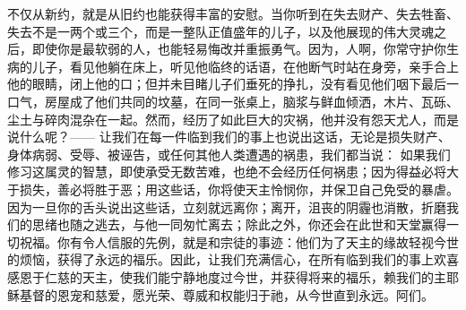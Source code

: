 不仅从新约，就是从旧约也能获得丰富的安慰。当你听到在失去财产、失去牲畜、失去不是一两个或三个，而是一整队正值盛年的儿子，以及他展现的伟大灵魂之后，即使你是最软弱的人，也能轻易悔改并重振勇气。因为，人啊，你常守护你生病的儿子，看见他躺在床上，听见他临终的话语，在他断气时站在身旁，亲手合上他的眼睛，闭上他的口；但并未目睹儿子们垂死的挣扎，没有看见他们咽下最后一口气，房屋成了他们共同的坟墓，在同一张桌上，脑浆与鲜血倾洒，木片、瓦砾、尘土与碎肉混杂在一起。然而，经历了如此巨大的灾祸，他并没有怨天尤人，而是说什么呢？—— 让我们在每一件临到我们的事上也说出这话，无论是损失财产、身体病弱、受辱、被诬告，或任何其他人类遭遇的祸患，我们都当说： 如果我们修习这属灵的智慧，即使承受无数苦难，也绝不会经历任何祸患；因为得益必将大于损失，善必将胜于恶；用这些话，你将使天主怜悯你，并保卫自己免受的暴虐。因为一旦你的舌头说出这些话，立刻就远离你；离开，沮丧的阴霾也消散，折磨我们的思绪也随之逃去，与他一同匆忙离去；除此之外，你还会在此世和天堂赢得一切祝福。你有令人信服的先例，就是和宗徒的事迹：他们为了天主的缘故轻视今世的烦恼，获得了永远的福乐。因此，让我们充满信心，在所有临到我们的事上欢喜感恩于仁慈的天主，使我们能宁静地度过今世，并获得将来的福乐，赖我们的主耶稣基督的恩宠和慈爱，愿光荣、尊威和权能归于祂，从今世直到永远。阿们。\par

